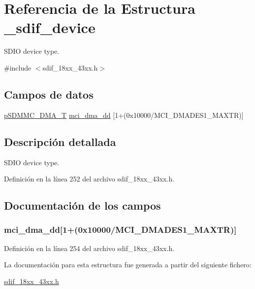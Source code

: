 \hypertarget{struct__sdif__device}{}\section{Referencia de la Estructura \+\_\+sdif\+\_\+device}
\label{struct__sdif__device}


S\+D\+IO device type.  




{\ttfamily \#include $<$sdif\+\_\+18xx\+\_\+43xx.\+h$>$}

\subsection*{Campos de datos}
\begin{DoxyCompactItemize}
\item 
\hyperlink{structp_s_d_m_m_c___d_m_a___t}{p\+S\+D\+M\+M\+C\+\_\+\+D\+M\+A\+\_\+T} \hyperlink{struct__sdif__device_a9beac5c19df56da5bda5f9b4a3d0109e}{mci\+\_\+dma\+\_\+dd} \mbox{[}1+(0x10000/\+M\+C\+I\+\_\+\+D\+M\+A\+D\+E\+S1\+\_\+\+M\+A\+X\+T\+R)\mbox{]}
\end{DoxyCompactItemize}


\subsection{Descripción detallada}
S\+D\+IO device type. 

Definición en la línea 252 del archivo sdif\+\_\+18xx\+\_\+43xx.\+h.



\subsection{Documentación de los campos}
\subsubsection[{\texorpdfstring{mci\+\_\+dma\+\_\+dd}{mci_dma_dd}}]{ mci\+\_\+dma\+\_\+dd\mbox{[}1+(0x10000/\+M\+C\+I\+\_\+\+D\+M\+A\+D\+E\+S1\+\_\+\+M\+A\+X\+T\+R)\mbox{]}}\hypertarget{struct__sdif__device_a9beac5c19df56da5bda5f9b4a3d0109e}{}\label{struct__sdif__device_a9beac5c19df56da5bda5f9b4a3d0109e}


Definición en la línea 254 del archivo sdif\+\_\+18xx\+\_\+43xx.\+h.



La documentación para esta estructura fue generada a partir del siguiente fichero\+:\begin{DoxyCompactItemize}
\item 
\hyperlink{sdif__18xx__43xx_8h}{sdif\+\_\+18xx\+\_\+43xx.\+h}\end{DoxyCompactItemize}
